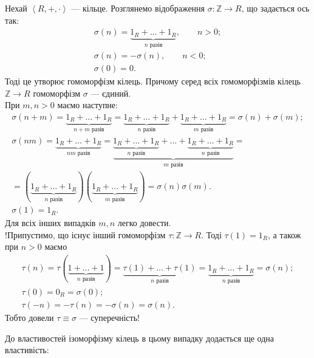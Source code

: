 \documentclass{math_library}
\begin{document}
\begin{example*}
Нехай $\left< R,+,\cdot\right>$ --- кільце. Розглянемо відображення $\sigma \colon \mathbb{Z} \to R$, що задається ось так:
\begin{align*}
\sigma(n) = \underbrace{1_R+\dots+1_R}_{n \text{ разів}},\qquad n > 0; \\
\sigma(n) = -\sigma(n),\qquad n < 0; \\
\sigma(0) = 0.
\end{align*}
Тоді це утворює гомоморфізм кілець. Причому серед всіх гомоморфізмів кілець $\mathbb{Z} \to R$ гомоморфізм $\sigma$ --- єдиний.\\
При $m,n > 0$ маємо наступне:
\begin{align*}
\sigma(n+m) = \underbrace{1_R+\dots+1_R}_{n+m \text{ разів}} = \underbrace{1_R+\dots+1_R}_{n \text{ разів}} + \underbrace{1_R+\dots+1_R}_{m \text{ разів}} = \sigma(n) + \sigma(m); \\
\sigma(nm) = \underbrace{1_R+\dots+1_R}_{nm \text{ разів}} = \underbrace{\underbrace{1_R+\dots+1_R}_{n \text{ разів}} + \dots + \underbrace{1_R+\dots+1_R}_{n \text{ разів}}}_{m \text{ разів}} = \\
= (\underbrace{1_R+\dots+1_R}_{n \text{ разів}}) (\underbrace{1_R+\dots+1_R}_{m \text{ разів}}) = \sigma(n) \sigma(m). \\
\sigma(1) = 1_R.
\end{align*}
Для всіх інших випадків $m,n$ легко довести.\\
!Припустимо, що існує інший гомоморфізм $\tau \colon \mathbb{Z} \to R$. Тоді $\tau(1) = 1_R$, а також при $n > 0$ маємо
\begin{align*}
\tau(n) = \tau(\underbrace{1+\dots+1}_{n \text{ разів}}) = \underbrace{\tau(1)+\dots+\tau(1)}_{n \text{ разів}} = \underbrace{1_R+\dots+1_R}_{n \text{ разів}} = \sigma(n); \\
\tau(0) = 0_R = \sigma(0); \\
\tau(-n) = -\tau(n) = -\sigma(n) = \sigma(n).
\end{align*}
Тобто довели $\tau \equiv \sigma$ --- суперечність!

\end{example*}

До властивостей ізоморфізму кілець в цьому випадку додається ще одна властивість:
\begin{proposition*}
\color{red}{Маємо $f \colon R \to S$ -- гомоморфізм кілець. Тоді
$a \in R^\times \iff f(a) \in S^\times$.}
\end{proposition*}
\end{document}

